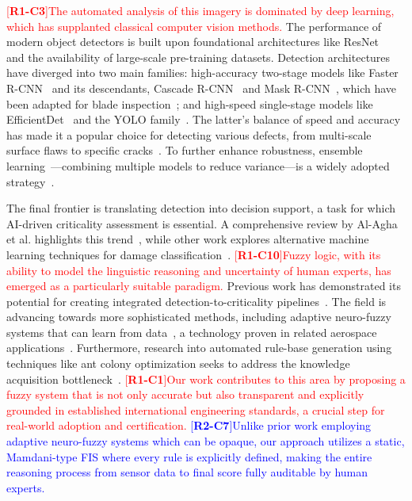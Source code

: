 \documentclass[energies,article,submit,pdftex,moreauthors]{Definitions/mdpi}
\newcommand{\revtag}[2]{[\textbf{R#1-C#2}]}
\newcommand{\Rone}[1]{\textcolor{red}{#1}}
\newcommand{\Rtwo}[1]{\textcolor{blue}{#1}}
\begin{document}
\Rone{\revtag{1}{3}The automated analysis of this imagery is dominated by deep learning, which has supplanted classical computer vision methods.} The performance of modern object detectors is built upon foundational architectures like ResNet~\cite{He2016Deep} and the availability of large-scale pre-training datasets. Detection architectures have diverged into two main families: high-accuracy two-stage models like Faster R-CNN~\cite{Ren2017Faster} and its descendants, Cascade R-CNN~\cite{Cai2018Cascade} and Mask R-CNN~\cite{He2017Mask}, which have been adapted for blade inspection~\cite{Diaz2023Fast}; and high-speed single-stage models like EfficientDet~\cite{Tan2020Efficientdet} and the YOLO family~\cite{Jocher2023Yolov8}. The latter's balance of speed and accuracy has made it a popular choice for detecting various defects, from multi-scale surface flaws to specific cracks~\cite{He2024Adaptive, Liu2023Wind, Zhao2025Enhancing}. To further enhance robustness, ensemble learning~\cite{Dietterich2000Ensemble}—combining multiple models to reduce variance—is a widely adopted strategy~\cite{Zhou2025Ensemble}.

The final frontier is translating detection into decision support, a task for which AI-driven criticality assessment is essential. A comprehensive review by Al-Agha et al. highlights this trend~\cite{Alagha2025Energies}, while other work explores alternative machine learning techniques for damage classification~\cite{CarmonaTroyo2025Classification}. \Rone{\revtag{1}{10}Fuzzy logic, with its ability to model the linguistic reasoning and uncertainty of human experts, has emerged as a particularly suitable paradigm.} Previous work has demonstrated its potential for creating integrated detection-to-criticality pipelines~\cite{Svystun2025CEUR}. The field is advancing towards more sophisticated methods, including adaptive neuro-fuzzy systems that can learn from data~\cite{Dubchak2024Adaptive}, a technology proven in related aerospace applications~\cite{Vladov2024Helicopter}. Furthermore, research into automated rule-base generation using techniques like ant colony optimization seeks to address the knowledge acquisition bottleneck~\cite{Kozlov2021Information}. \Rone{\revtag{1}{1}Our work contributes to this area by proposing a fuzzy system that is not only accurate but also transparent and explicitly grounded in established international engineering standards, a crucial step for real-world adoption and certification.} \Rtwo{\revtag{2}{7}Unlike prior work employing adaptive neuro-fuzzy systems which can be opaque, our approach utilizes a static, Mamdani-type FIS where every rule is explicitly defined, making the entire reasoning process from sensor data to final score fully auditable by human experts.}
\end{document}
